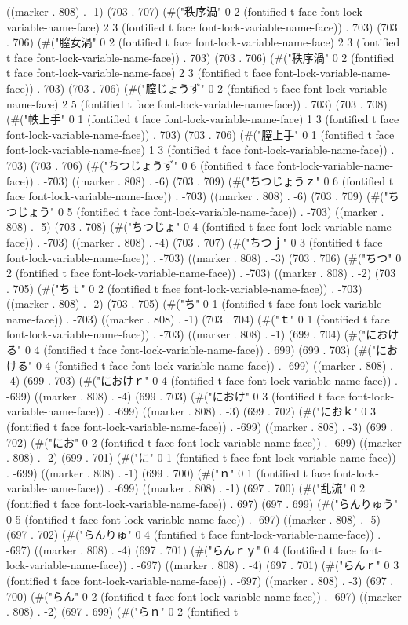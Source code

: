((marker . 808) . -1) (703 . 707) (#("秩序渦" 0 2 (fontified t face font-lock-variable-name-face) 2 3 (fontified t face font-lock-variable-name-face)) . 703) (703 . 706) (#("膣女渦" 0 2 (fontified t face font-lock-variable-name-face) 2 3 (fontified t face font-lock-variable-name-face)) . 703) (703 . 706) (#("秩序渦" 0 2 (fontified t face font-lock-variable-name-face) 2 3 (fontified t face font-lock-variable-name-face)) . 703) (703 . 706) (#("膣じょうず" 0 2 (fontified t face font-lock-variable-name-face) 2 5 (fontified t face font-lock-variable-name-face)) . 703) (703 . 708) (#("帙上手" 0 1 (fontified t face font-lock-variable-name-face) 1 3 (fontified t face font-lock-variable-name-face)) . 703) (703 . 706) (#("膣上手" 0 1 (fontified t face font-lock-variable-name-face) 1 3 (fontified t face font-lock-variable-name-face)) . 703) (703 . 706) (#("ちつじょうず" 0 6 (fontified t face font-lock-variable-name-face)) . -703) ((marker . 808) . -6) (703 . 709) (#("ちつじょうｚ" 0 6 (fontified t face font-lock-variable-name-face)) . -703) ((marker . 808) . -6) (703 . 709) (#("ちつじょう" 0 5 (fontified t face font-lock-variable-name-face)) . -703) ((marker . 808) . -5) (703 . 708) (#("ちつじょ" 0 4 (fontified t face font-lock-variable-name-face)) . -703) ((marker . 808) . -4) (703 . 707) (#("ちつｊ" 0 3 (fontified t face font-lock-variable-name-face)) . -703) ((marker . 808) . -3) (703 . 706) (#("ちつ" 0 2 (fontified t face font-lock-variable-name-face)) . -703) ((marker . 808) . -2) (703 . 705) (#("ちｔ" 0 2 (fontified t face font-lock-variable-name-face)) . -703) ((marker . 808) . -2) (703 . 705) (#("ち" 0 1 (fontified t face font-lock-variable-name-face)) . -703) ((marker . 808) . -1) (703 . 704) (#("ｔ" 0 1 (fontified t face font-lock-variable-name-face)) . -703) ((marker . 808) . -1) (699 . 704) (#("における" 0 4 (fontified t face font-lock-variable-name-face)) . 699) (699 . 703) (#("における" 0 4 (fontified t face font-lock-variable-name-face)) . -699) ((marker . 808) . -4) (699 . 703) (#("におけｒ" 0 4 (fontified t face font-lock-variable-name-face)) . -699) ((marker . 808) . -4) (699 . 703) (#("におけ" 0 3 (fontified t face font-lock-variable-name-face)) . -699) ((marker . 808) . -3) (699 . 702) (#("におｋ" 0 3 (fontified t face font-lock-variable-name-face)) . -699) ((marker . 808) . -3) (699 . 702) (#("にお" 0 2 (fontified t face font-lock-variable-name-face)) . -699) ((marker . 808) . -2) (699 . 701) (#("に" 0 1 (fontified t face font-lock-variable-name-face)) . -699) ((marker . 808) . -1) (699 . 700) (#("ｎ" 0 1 (fontified t face font-lock-variable-name-face)) . -699) ((marker . 808) . -1) (697 . 700) (#("乱流" 0 2 (fontified t face font-lock-variable-name-face)) . 697) (697 . 699) (#("らんりゅう" 0 5 (fontified t face font-lock-variable-name-face)) . -697) ((marker . 808) . -5) (697 . 702) (#("らんりゅ" 0 4 (fontified t face font-lock-variable-name-face)) . -697) ((marker . 808) . -4) (697 . 701) (#("らんｒｙ" 0 4 (fontified t face font-lock-variable-name-face)) . -697) ((marker . 808) . -4) (697 . 701) (#("らんｒ" 0 3 (fontified t face font-lock-variable-name-face)) . -697) ((marker . 808) . -3) (697 . 700) (#("らん" 0 2 (fontified t face font-lock-variable-name-face)) . -697) ((marker . 808) . -2) (697 . 699) (#("らｎ" 0 2 (fontified t 